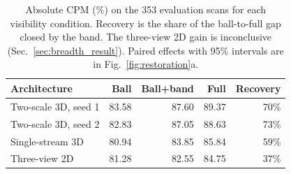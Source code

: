 \begin{table}[t]
\centering
\small
\setlength{\tabcolsep}{4.5pt}
\caption{Absolute CPM (\%) on the 353 evaluation scans for each visibility condition. Recovery is the share of the ball-to-full gap closed by the band. The three-view 2D gain is inconclusive (Sec.~\ref{sec:breadth_result}). Paired effects with 95\% intervals are in Fig.~\ref{fig:restoration}a.}
\label{tab:visibility}
\begin{tabular}{@{}lrrrr@{}}
\toprule
Architecture & Ball & Ball+band & Full & Recovery \\
\midrule
Two-scale 3D, seed 1 & 83.58 & 87.60 & 89.37 & 70\% \\
Two-scale 3D, seed 2 & 82.83 & 87.05 & 88.63 & 73\% \\
Single-stream 3D & 80.94 & 83.85 & 85.84 & 59\% \\
Three-view 2D & 81.28 & 82.55 & 84.75 & 37\% \\
\bottomrule
\end{tabular}
\end{table}
